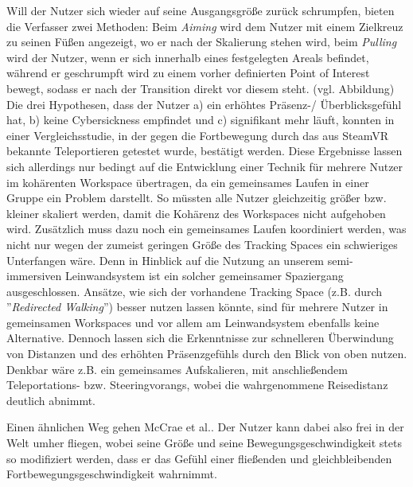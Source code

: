 Will der Nutzer sich wieder auf seine Ausgangsgröße zurück schrumpfen, bieten die Verfasser zwei Methoden: Beim \textit{Aiming} wird dem Nutzer mit einem Zielkreuz zu seinen Füßen angezeigt, wo er nach der Skalierung stehen wird, beim \textit{Pulling} wird der Nutzer, wenn er sich innerhalb eines festgelegten Areals befindet, während er geschrumpft wird zu einem vorher definierten Point of Interest bewegt, sodass er nach der Transition direkt vor diesem steht. (vgl. Abbildung)
Die drei Hypothesen, dass der Nutzer a) ein erhöhtes Präsenz-/ Überblicksgefühl hat, b) keine Cybersickness empfindet und c) signifikant mehr läuft, konnten in einer Vergleichsstudie, in der gegen die Fortbewegung durch das aus SteamVR bekannte Teleportieren getestet wurde, bestätigt werden.
Diese Ergebnisse lassen sich allerdings nur bedingt auf die Entwicklung einer Technik für mehrere Nutzer im kohärenten Workspace übertragen, da ein gemeinsames Laufen in einer Gruppe ein Problem darstellt. So müssten alle Nutzer gleichzeitig größer bzw. kleiner skaliert werden, damit die Kohärenz des Workspaces nicht aufgehoben wird. Zusätzlich muss dazu noch ein gemeinsames Laufen koordiniert werden, was nicht nur wegen der zumeist geringen Größe des Tracking Spaces ein schwieriges Unterfangen wäre. Denn in Hinblick auf die Nutzung an unserem semi-immersiven Leinwandsystem ist ein solcher gemeinsamer Spaziergang ausgeschlossen. Ansätze, wie sich der vorhandene Tracking Space  (z.B. durch ”\textit{Redirected Walking}”\cite{RazzaqueRedirectedWalking}) besser nutzen lassen könnte, sind für mehrere Nutzer in gemeinsamen Workspaces und vor allem am Leinwandsystem ebenfalls keine Alternative. 
Dennoch lassen sich die Erkenntnisse zur schnelleren Überwindung von Distanzen und des erhöhten Präsenzgefühls durch den Blick von oben nutzen. Denkbar wäre z.B. ein gemeinsames Aufskalieren, mit anschließendem Teleportations- bzw. Steeringvorangs, wobei die wahrgenommene Reisedistanz deutlich abnimmt.




Einen ähnlichen Weg gehen McCrae et al.\cite{McCrae2009MultiscaleNavigation}.
Der Nutzer kann dabei also frei in der Welt umher fliegen, wobei seine Größe und seine Bewegungsgeschwindigkeit stets so modifiziert werden, dass er das Gefühl einer fließenden und gleichbleibenden Fortbewegungsgeschwindigkeit wahrnimmt. 

